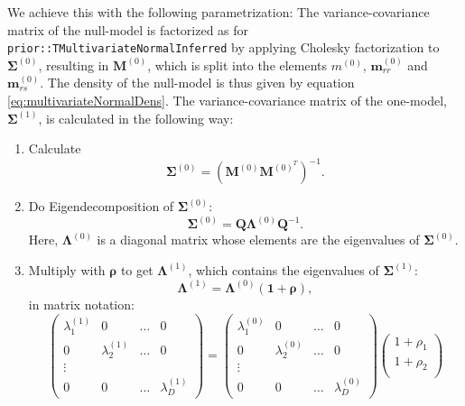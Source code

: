 \documentclass[a4paper,11pt]{article}
\def\bOne{\boldsymbol{1}}
\def\M{\boldsymbol{M}}
\def\Q{\boldsymbol{Q}}
\def\bmrr{\boldsymbol m_{rr}}
\def\bmrs{\boldsymbol m_{rs}}
\def\brho{\boldsymbol{\rho}}
\def\bSigma{\boldsymbol{\Sigma}}
\def\bLambda{\boldsymbol{\Lambda}}
\newcommand{\class}[1]{\texttt{#1}}
\begin{document}
We achieve this with the following parametrization: The variance-covariance matrix of the null-model is factorized as for \class{prior::TMultivariateNormalInferred} by applying Cholesky factorization to $\bSigma^{(0)}$, resulting in $\M^{(0)}$, which is split into the elements $m^{(0)}$, $\bmrr^{(0)}$ and $\bmrs^{(0)}$. The density of the null-model is thus given by equation \ref{eq:multivariateNormalDens}. The variance-covariance matrix of the one-model, $\bSigma^{(1)}$, is calculated in the following way:
\begin{enumerate}
    \item Calculate
    \begin{equation}\label{eq:Cholesky}
        \bSigma^{(0)} = \left(\M^{(0)} \M^{{(0)}^T}\right)^{-1}.
    \end{equation}
    \item Do Eigendecomposition of $\bSigma^{(0)}$:
     \begin{equation}\label{eq:eigendecomposition}
         \bSigma^{(0)} = \Q \bLambda^{(0)} \Q^{-1}.
     \end{equation}
     Here, $\bLambda^{(0)}$ is a diagonal matrix whose elements are the eigenvalues of $\bSigma^{(0)}$.
     \item Multiply with $\boldsymbol \rho$ to get $\bLambda^{(1)}$, which contains the eigenvalues of $\bSigma^{(1)}$:
     \begin{equation}\label{eq:stretchWithRho}
        \bLambda^{(1)} = \bLambda^{(0)} \left( \bOne + \brho \right),
     \end{equation}
     in matrix notation:
     \begin{equation*}
      \begin{pmatrix} \lambda_{1}^{(1)} & 0 &  \ldots & 0\\
      0 & \lambda_{2}^{(1)} & \ldots & 0\\
      \vdots\\
      0 & 0 & \ldots & \lambda_{D}^{(1)}
      \end{pmatrix} =
     \begin{pmatrix} \lambda_{1}^{(0)} & 0 &  \ldots & 0\\
      0 & \lambda_{2}^{(0)} & \ldots & 0\\
      \vdots\\
      0 & 0 & \ldots & \lambda_{D}^{(0)}
      \end{pmatrix}
      \begin{pmatrix}
      1 + \rho_{1}\\
      1 + \rho_{2}\\

\end{pmatrix}
\end{equation*}
\end{enumerate}
\end{document}
